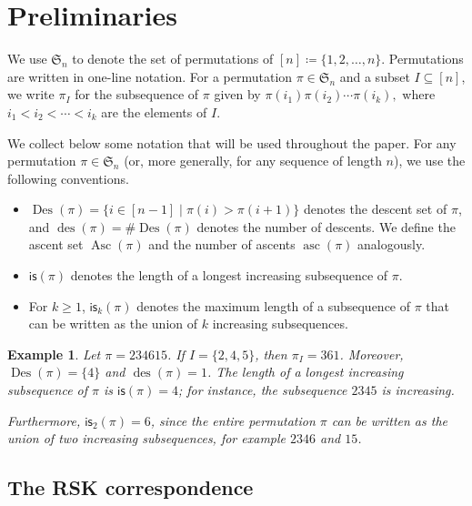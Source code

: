 \documentclass[12pt]{article}
\newcommand{\is}{\mathsf{is}}
\newcommand{\asc}{\operatorname{asc}}
\newcommand{\des}{\operatorname{des}}
\newcommand{\Asc}{\operatorname{Asc}}
\newcommand{\Des}{\operatorname{Des}}
\newcommand{\s}{\mathfrak{S}}
\newtheorem{example}[theorem]{Example}
\theoremstyle{definition}
\begin{document}

\section{Preliminaries}\label{sec:prelims}

We use $\s_n$ to denote the set of permutations of $[n] \coloneqq \{1, 2, \ldots, n\}$.
Permutations are written in one-line notation. 
For a permutation $\pi \in \s_n$ and a subset $I \subseteq [n]$, we write $\pi_I$
for the subsequence of $\pi$ given by $\pi(i_1)\pi(i_2)\cdots\pi(i_k),$ 
where $i_1 < i_2 < \cdots < i_k$ are the elements of $I$.

We collect below some notation that will be used throughout the paper.
For any permutation $\pi \in \s_n$ (or, more generally, for any sequence of length
$n$), we use the following conventions.
\begin{itemize}
	\item $\Des(\pi) = \{ i \in [n-1] \mid \pi(i) > \pi(i+1) \}$ denotes the descent
	set of $\pi$, and $\des(\pi) = \#\Des(\pi)$ denotes the number of descents.
	We define the ascent set $\Asc(\pi)$ and the number of ascents $\asc(\pi)$
	analogously.
	
	\item $\is(\pi)$ denotes the length of a longest increasing subsequence of $\pi$.
	
	\item For $k \ge 1$, $\is_k(\pi)$ denotes the maximum length of a subsequence of
	$\pi$ that can be written as the union of $k$ increasing subsequences.
\end{itemize}

\begin{example}
	Let $\pi = 234615$. If $I = \{2,4,5\}$, then $\pi_I = 361$.
	Moreover, $\Des(\pi) = \{4\}$ and $\des(\pi) = 1$.
	The length of a longest increasing subsequence of $\pi$ is $\is(\pi) = 4$; for
	instance, the subsequence $2345$ is increasing.
	
	Furthermore, $\is_2(\pi) = 6$, since the entire permutation $\pi$ can be written as
	the union of two increasing subsequences, for example $2346$ and $15$.
\end{example}


\subsection{The RSK correspondence}
\end{document}
